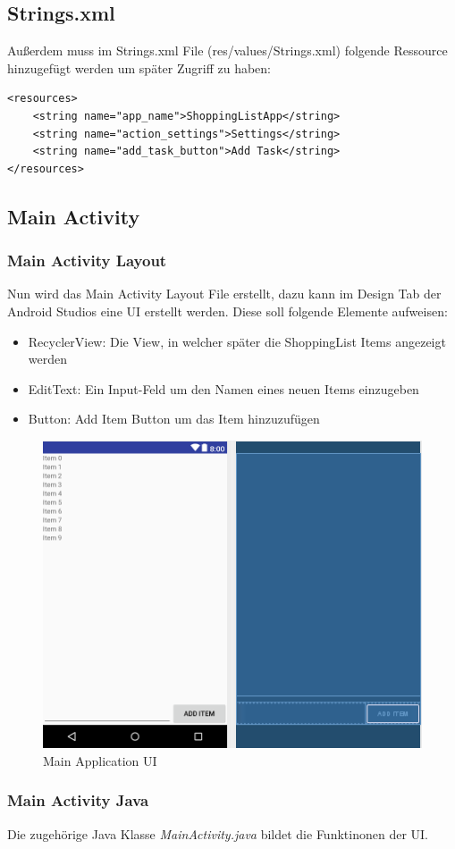 \subsection{Strings.xml}
Außerdem muss im Strings.xml File (res/values/Strings.xml) folgende Ressource hinzugefügt werden um später Zugriff zu haben:
\begin{lstlisting}
<resources>
	<string name="app_name">ShoppingListApp</string>
	<string name="action_settings">Settings</string>
	<string name="add_task_button">Add Task</string>
</resources>
\end{lstlisting}

\subsection{Main Activity}
\subsubsection{Main Activity Layout}
Nun wird das Main Activity Layout File erstellt, dazu kann im Design Tab der Android Studios eine UI erstellt werden. Diese soll folgende Elemente aufweisen:
\begin{itemize}
	\item RecyclerView: Die View, in welcher später die ShoppingList Items angezeigt werden
	\item EditText: Ein Input-Feld um den Namen eines neuen Items einzugeben
	\item Button: Add Item Button um das Item hinzuzufügen
\end{itemize}

\begin{figure}[!h]
	\centering
	\includegraphics[width=0.6\linewidth]{images/layoutmain}
	\caption{Main Application UI}
	\label{fig:layoutmain}
\end{figure}

\subsubsection{Main Activity Java}
Die zugehörige Java Klasse \textit{MainActivity.java} bildet die Funktinonen der UI.

